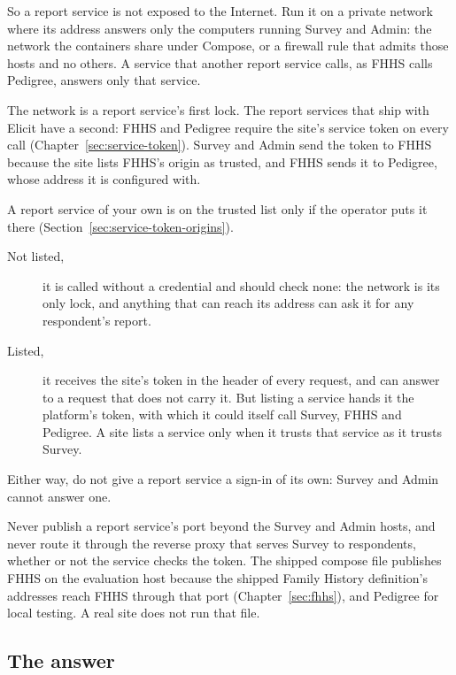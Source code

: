 \documentclass[11pt, a4paper]{article}
\begin{document}
So a report service is not exposed to the Internet. Run it on a private network where its
address answers only the computers running Survey and Admin: the network the containers share
under Compose, or a firewall rule that admits those hosts and no others. A service that another
report service calls, as FHHS calls Pedigree, answers only that service.

The network is a report service's first lock. The report services that ship with Elicit have a
second: FHHS and Pedigree require the site's service token on every call
(Chapter~\ref{sec:service-token}). Survey and Admin send the token to FHHS because the site
lists FHHS's origin as trusted, and FHHS sends it to Pedigree, whose address it is configured
with.

A report service of your own is on the trusted list only if the operator puts it there
(Section~\ref{sec:service-token-origins}).

\begin{description}
  \item[Not listed,] it is called without a credential and should check none: the network
        is its only lock, and anything that can reach its address can ask it for any
        respondent's report.
  \item[Listed,] it receives the site's token in the  header of
        every request, and can answer  to a request that does not carry it. But
        listing a service hands it the platform's token, with which it could itself call
        Survey, FHHS and Pedigree. A site lists a service only when it trusts that service as
        it trusts Survey.
\end{description}

Either way, do not give a report service a sign-in of its own: Survey and Admin cannot answer
one.

\begin{elicitsecurity}
Never publish a report service's port beyond the Survey and Admin hosts, and never route it
through the reverse proxy that serves Survey to respondents, whether or not the service checks
the token. The shipped compose file publishes FHHS on the evaluation host because the shipped
Family History definition's addresses reach FHHS through that port
(Chapter~\ref{sec:fhhs}), and Pedigree for local testing. A real site does not run that file.
\end{elicitsecurity}

\subsection{The answer}
\end{document}
